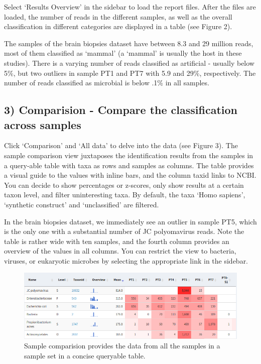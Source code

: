 \documentclass[]{article}
\begin{document}
Select `Results Overview' in the sidebar to load the report files. After
the files are loaded, the number of reads in the different samples, as
well as the overall classification in different categories are displayed
in a table (see Figure 2).

The samples of the brain biopsies dataset have between 8.3 and 29
million reads, most of them classified as `mammal' (a `mammal' is
usually the host in these studies). There is a varying number of reads
classified as artificial - usually below 5\%, but two outliers in sample
PT1 and PT7 with 5.9 and 29\%, respectively. The number of reads
classified as microbial is below .1\% in all samples.

\subsection{3) Comparision - Compare the classification across
samples}\label{comparision---compare-the-classification-across-samples}

Click `Comparison' and `All data' to delve into the data (see Figure 3).
The sample comparison view juxtaposes the identification results from
the samples in a query-able table with taxa as rows and samples as
columns. The table provides a visual guide to the values with inline
bars, and the column taxid links to NCBI. You can decide to show
percentages or z-scores, only show results at a certain taxon level, and
filter uninteresting taxa. By default, the taxa `Homo sapiens',
`synthetic construct' and `unclassified' are filtered.

In the brain biopsies dataset, we immediately see an outlier in sample
PT5, which is the only one with a substantial number of JC polyomavirus
reads. Note the table is rather wide with ten samples, and the fourth
column provides an overview of the values in all columns. You can
restrict the view to bacteria, viruses, or eukaryotic microbes by
selecting the appropriate link in the sidebar.

\begin{figure}[htbp]
\centering
\includegraphics{menu-comp.png}
\caption{Sample comparision provides the data from all the samples in a
sample set in a concise queryable table.}
\end{figure}
\end{document}
